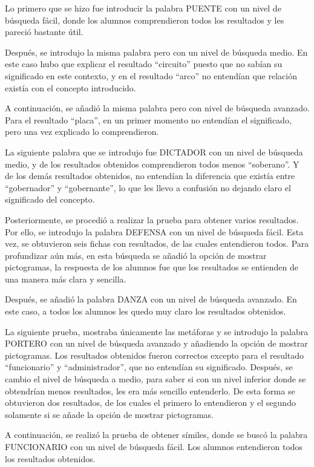 Lo primero que se hizo fue introducir la palabra PUENTE con un nivel de búsqueda fácil, donde los alumnos comprendieron todos los resultados y les pareció bastante útil.

Después, se introdujo la misma palabra pero con un nivel de búsqueda medio. En este caso hubo que explicar el resultado ``circuito'' puesto que no sabían su significado en este contexto, y en el resultado ``arco''  no entendían que relación existía con el concepto introducido.

A continuación, se añadió la misma palabra pero con nivel de búsqueda avanzado. Para el resultado  ``placa'', en un primer momento no entendían el significado, pero una vez explicado lo comprendieron.

La siguiente palabra que se introdujo fue DICTADOR con un nivel de búsqueda medio, y de los resultados obtenidos comprendieron todos menos ``soberano''. Y de los demás resultados obtenidos, no entendían la diferencia que existía entre ``gobernador'' y ``gobernante'', lo que les llevo a confusión no dejando claro el significado del concepto.

Posteriormente, se procedió a realizar la prueba para obtener varios resultados. Por ello, se introdujo la palabra DEFENSA con un nivel de búsqueda fácil. Esta vez, se obtuvieron seis fichas con resultados, de las cuales entendieron todos. Para profundizar aún más, en esta búsqueda se añadió la opción de mostrar pictogramas, la respuesta de los alumnos fue que los resultados se entienden de una manera más clara y sencilla.

Después, se añadió la palabra DANZA con un nivel de búsqueda avanzado. En este caso, a todos los alumnos les quedo muy claro los resultados obtenidos.

La siguiente prueba, mostraba únicamente las metáforas y se introdujo la palabra PORTERO con un nivel de búsqueda avanzado y añadiendo la opción de mostrar pictogramas. Los resultados obtenidos fueron correctos excepto para el resultado ``funcionario'' y ``administrador'', que no entendían su significado. Después, se cambio el nivel de búsqueda a medio, para saber si con un nivel inferior donde se obtendrían menos resultados, les era más sencillo entenderlo. De esta forma se obtuvieron dos resultados, de los cuales el primero lo entendieron y el segundo solamente si se añade la opción de mostrar pictogramas.


A continuación, se realizó la prueba de obtener símiles, donde se buscó la palabra FUNCIONARIO con un nivel de búsqueda fácil. Los alumnos entendieron todos los resultados obtenidos.

